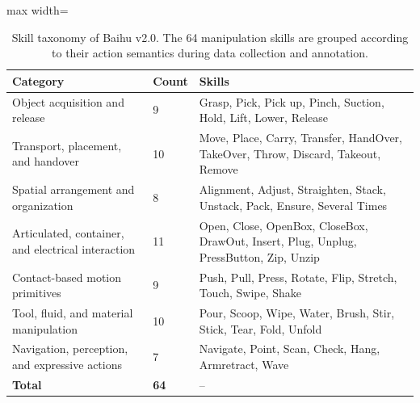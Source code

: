 
\begin{table}[t]
\centering
\caption{Skill taxonomy of Baihu v2.0. The 64 manipulation skills are grouped according to their action semantics during data collection and annotation.}
\label{tab:skill-taxonomy}
\footnotesize
\setlength{\tabcolsep}{4pt}
\renewcommand{\arraystretch}{1.15}
\begin{adjustbox}{max width=\textwidth}
\begin{tabularx}{\textwidth}{p{}p{}X}
\toprule
Category & Count & Skills \\
\midrule
Object acquisition and release & 9 & Grasp, Pick, Pick up, Pinch, Suction, Hold, Lift, Lower, Release \\
Transport, placement, and handover & 10 & Move, Place, Carry, Transfer, HandOver, TakeOver, Throw, Discard, Takeout, Remove \\
Spatial arrangement and organization & 8 & Alignment, Adjust, Straighten, Stack, Unstack, Pack, Ensure, Several Times \\
Articulated, container, and electrical interaction & 11 & Open, Close, OpenBox, CloseBox, DrawOut, Insert, Plug, Unplug, PressButton, Zip, Unzip \\
Contact-based motion primitives & 9 & Push, Pull, Press, Rotate, Flip, Stretch, Touch, Swipe, Shake \\
Tool, fluid, and material manipulation & 10 & Pour, Scoop, Wipe, Water, Brush, Stir, Stick, Tear, Fold, Unfold \\
Navigation, perception, and expressive actions & 7 & Navigate, Point, Scan, Check, Hang, Armretract, Wave \\
\midrule
\textbf{Total} & \textbf{64} & -- \\
\bottomrule
\end{tabularx}
\end{adjustbox}
\end{table}
